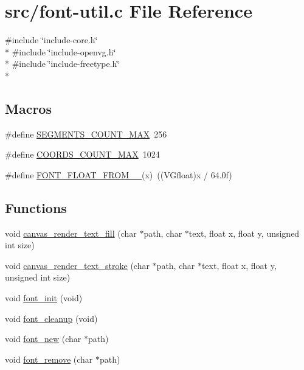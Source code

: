 \hypertarget{font-util_8c}{}\section{src/font-\/util.c File Reference}
\label{font-util_8c}
{\ttfamily \#include \char`\"{}include-\/core.\+h\char`\"{}}\\*
{\ttfamily \#include \char`\"{}include-\/openvg.\+h\char`\"{}}\\*
{\ttfamily \#include \char`\"{}include-\/freetype.\+h\char`\"{}}\\*
\subsection*{Macros}
\begin{DoxyCompactItemize}
\item 
\#define \hyperlink{font-util_8c_a8bf9a10d3231b69eaffed4017b90aa8a}{S\+E\+G\+M\+E\+N\+T\+S\+\_\+\+C\+O\+U\+N\+T\+\_\+\+M\+A\+X}~256
\item 
\#define \hyperlink{font-util_8c_a3328f7792ae2c0722a0ad16bce879029}{C\+O\+O\+R\+D\+S\+\_\+\+C\+O\+U\+N\+T\+\_\+\+M\+A\+X}~1024
\item 
\#define \hyperlink{font-util_8c_a879da8d8ac74b55e73b8725d4161fdc5}{F\+O\+N\+T\+\_\+\+F\+L\+O\+A\+T\+\_\+\+F\+R\+O\+M\+\_\+\_}(x)~((V\+Gfloat)x / 64.\+0f)
\end{DoxyCompactItemize}
\subsection*{Functions}
\begin{DoxyCompactItemize}
\item 
void \hyperlink{font-util_8c_ae3bb49cd03b02cac95a2748cfd50c8f6}{canvas\+\_\+render\+\_\+text\+\_\+fill} (char $\ast$path, char $\ast$text, float x, float y, unsigned int size)
\item 
void \hyperlink{font-util_8c_a0beaa53ffa53d09c2ae9b6848dd24cc7}{canvas\+\_\+render\+\_\+text\+\_\+stroke} (char $\ast$path, char $\ast$text, float x, float y, unsigned int size)
\item 
void \hyperlink{font-util_8c_a669b357bedc37be27d7549bd3b8b36f8}{font\+\_\+init} (void)
\item 
void \hyperlink{font-util_8c_a10be0bd82203d8a8b471752915ac73d7}{font\+\_\+cleanup} (void)
\item 
void \hyperlink{font-util_8c_a8860cee077ba27edc442a3fdf9440bdc}{font\+\_\+new} (char $\ast$path)
\item 
void \hyperlink{font-util_8c_a7f5555363a802647a1a2cfdd67891922}{font\+\_\+remove} (char $\ast$path)
\end{DoxyCompactItemize}


